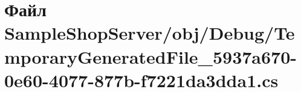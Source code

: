\hypertarget{_sample_shop_server_2obj_2_debug_2_temporary_generated_file__5937a670-0e60-4077-877b-f7221da3dda1_8cs}{}\section{Файл Sample\+Shop\+Server/obj/\+Debug/\+Temporary\+Generated\+File\+\_\+5937a670-\/0e60-\/4077-\/877b-\/f7221da3dda1.cs}
\label{_sample_shop_server_2obj_2_debug_2_temporary_generated_file__5937a670-0e60-4077-877b-f7221da3dda1_8cs}
